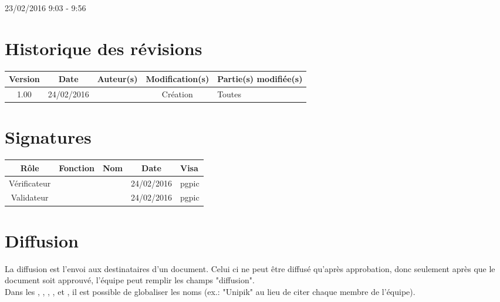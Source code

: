\documentclass [a4paper] {article}
\begin{document}
\rhead{}

23/02/2016
\hfill   
\hfill 	9:03 - 9:56 				%



\section*{Historique des révisions}
\begin{center}
			\begin{tabular}{| c | c | c | c | p{4cm} |}
				\hline
				\rowcolor{Gray}
				Version & Date & Auteur(s) & Modification(s) & Partie(s) modifiée(s)		 \\
				\hline
				1.00 & 24/02/2016 & \Pierre & Création & Toutes \\
		\hline		
			\end{tabular}
		\end{center}

\section*{Signatures}

		\begin{center}
			\begin{tabular}{| c | c | c | c | p{4cm} |}
				\hline
				\rowcolor{Gray}
				Rôle & Fonction & Nom & Date & Visa		 \\
				\hline
				Vérificateur & \RQA & \Kafui & 24/02/2016 & pgpic \\[30pt]
				\hline
				Validateur & \CP & \Sergi & 24/02/2016 & pgpic \\[30pt]	
				\hline
			\end{tabular}
		\end{center}


\section{Diffusion}
La diffusion est l'envoi aux destinataires d'un document. Celui ci ne peut être diffusé qu'après approbation, donc seulement après que le document soit approuvé, l'équipe peut remplir les champs "diffusion". \\
Dans les \DSE{}, \DSI{}, \PTV{}, \PQ{}, \PGC{} et \CDR{}, il est possible de globaliser les noms (ex.: "Unipik" au lieu de citer chaque membre de l'équipe).
\end{document}
